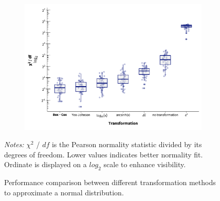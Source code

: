 \documentclass[
  man,floatsintext]{apa7}
\begin{document}
\begin{figure}[H]

\begin{figure}
\includegraphics[width=0.9\linewidth]{../results/figures/rt_transformation} \end{figure}

\caption{Performance comparison between different transformation methods to approximate a normal distribution. \label{fig:pressure}}
\begingroup
\footnotesize
\textit{Notes:} $\chi^2$ / $df$ is the Pearson normality statistic divided by its degrees of freedom. Lower values indicates better normality fit. Ordinate is displayed on a $log_2$ scale to enhance visibility.
\endgroup
\end{figure}
\end{document}

